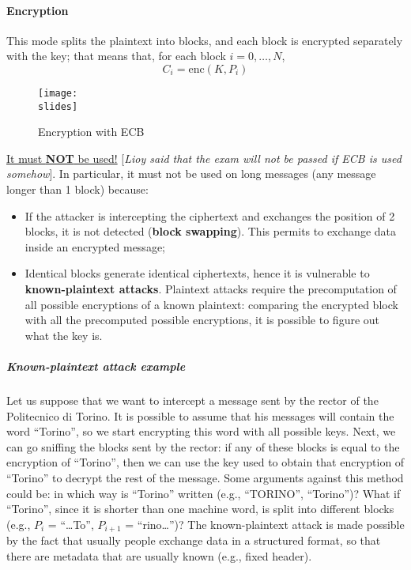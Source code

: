 \paragraph{Encryption}
This mode splits the plaintext into blocks, and each block is encrypted separately with the key;
that means that, for each block \(i = 0, \ldots, N\),
\[
    C_i = \text{enc}(K, P_i)
\]
\begin{figure}[h]
    \centering
    \texttt{[image: \\slides]}
    \caption{Encryption with ECB}
\end{figure}

\underline{It must \textbf{NOT} be used!} [\textit{Lioy said that the exam will not be passed if ECB is used somehow}].
In particular, it must not be used on long messages (any message longer than 1 block) because:
\begin{itemize}
    \item If the attacker is intercepting the ciphertext and exchanges the position of 2 blocks, it is not detected (\textbf{block swapping}). This permits to exchange data inside an encrypted message;
    \item Identical blocks generate identical ciphertexts, hence it is vulnerable to \textbf{known-plaintext attacks}. Plaintext attacks require the precomputation of all possible encryptions of a known plaintext: comparing the encrypted block with all the precomputed possible encryptions, it is possible to figure out what the key is.
\end{itemize}

\subparagraph{Known-plaintext attack example}
Let us suppose that we want to intercept a message sent by the rector of the Politecnico di Torino. It is possible
to assume that his messages will contain the word “Torino”, so we start encrypting this word with all possible
keys. Next, we can go sniffing the blocks sent by the rector: if any of these blocks is equal to the encryption
of “Torino”, then we can use the key used to obtain that encryption of “Torino” to decrypt the rest of the
message. Some arguments against this method could be: in which way is “Torino” written (e.g., “TORINO”,
“Torino”)? What if “Torino”, since it is shorter than one machine word, is split into different blocks (e.g., \(P_i\) =
“…To”, \(P_{i+1}\) = “rino…”)? The known-plaintext attack is made possible by the fact that usually people exchange
data in a structured format, so that there are metadata that are usually known (e.g., fixed header).


